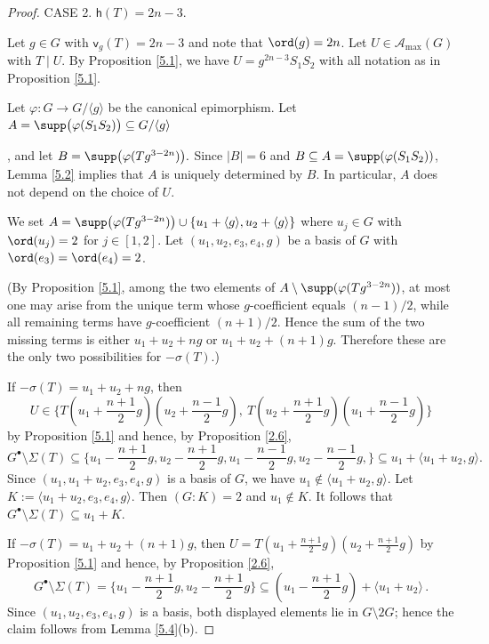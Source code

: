 \documentclass[a4paper, 10pt]{amsart}
\theoremstyle{plain}
\theoremstyle{definition}
\numberwithin{equation}{section}
\begin{document}
{\begin{proof}
\smallskip
\noindent
CASE 2.	 $\mathsf h (T)= 2n-3$.

Let $g \in G$ with $\mathsf{v}_{g}(T)=2n-3$ and note that $\ord(g)=2n$. Let $U \in \mathcal A_{\max} (G)$ with $T \mid U$. By Proposition \ref{5.1}, we have $U = g^{2n-3}S_1S_2$ with all notation as in Proposition \ref{5.1}.

Let $\varphi \colon G\to G/\langle g \rangle$ be the canonical epimorphism. Let
	 $A=\supp \big( \varphi (S_1S_2) \big)\subseteq G/\langle g \rangle $
	
		, and let
		$B=\supp\big(\varphi(Tg^{3-2n})\big).$
		Since $|B|=6$ and
		$B\subseteq A=\supp(\varphi(S_1S_2))$,
		Lemma \ref{5.2} implies that
		$A$ is uniquely determined by $B$.
		In particular, $A$ does not depend on the choice of $U$.
	
	We set $A=\supp \big(\varphi(Tg^{3-2n}) \big)\cup \{ u_1+\langle g \rangle,u_2+\langle g \rangle\}$ where $u_j\in G$ with $\ord(u_j)=2$ for $j \in [1,2]$. Let $(u_1,u_2,e_3,e_4, g)$ be a basis of $G$ with $\ord (e_3)=\ord (e_4)=2$. %
	
		(By Proposition \ref{5.1},
		among the two elements of
		$A\setminus \supp(\varphi(Tg^{3-2n}))$,
		at most one may arise from the unique term whose
		$g$-coefficient equals $(n-1)/2$,
		while all remaining terms have
		$g$-coefficient $(n+1)/2$.
		Hence the sum of the two missing terms is either $
		u_1+u_2+ng$ or $
		u_1+u_2+(n+1)g.
		$
		Therefore these are the only two possibilities for
		$-\sigma(T)$.)
	

	If $-\sigma(T)= u_1+u_2+ ng$, then 
\[
U \in \Big\{T(u_1+\frac{n+1}{2}g)(u_2+\frac{n-1}{2}g) , \ T(u_2+\frac{n+1}{2}g)(u_1+\frac{n-1}{2}g) \Big\}
\]
by Proposition \ref{5.1} and hence, by Proposition \ref{2.6},  
	$$
	G^{\bullet}\setminus \Sigma (T) 
	\subseteq\{u_1-\frac{n+1}{2}g,u_2-\frac{n+1}{2}g,u_1-\frac{n-1}{2}g,u_2-\frac{n-1}{2}g,\}
	\subseteq u_1+\langle u_1+u_2, g \rangle.
	$$
Since $(u_1, u_1+u_2,e_3,e_4, g)$ is a basis of $G$, we have $u_1 \notin \langle u_1+u_2, g \rangle$. Let $ K :=\langle u_1+u_2,e_3,e_4, g \rangle$. Then $(G:K)=2$ and $u_1\notin K$. It follows that $
G^\bullet\setminus\Sigma(T)
\subseteq u_1+K $.
	
	
If $-\sigma(T)= u_1+u_2+ (n+1)g$, then $U=T(u_1+\frac{n+1}{2}g)(u_2+\frac{n+1}{2}g)$ by Proposition \ref{5.1} and hence, by Proposition \ref{2.6},  
\[
	G^{\bullet}\setminus \Sigma (T)  
	=\{u_1-\frac{n+1}{2}g,u_2-\frac{n+1}{2}g\}
	\subseteq (u_1-\frac{n+1}{2}g)+\langle u_1+u_2\rangle \,. 
\]
Since $(u_1,u_2,e_3,e_4,g)$ is a basis, both displayed elements lie in $G\setminus2G$; hence the claim follows from Lemma \ref{5.4}(b).
\end{proof}





}
\end{document}
